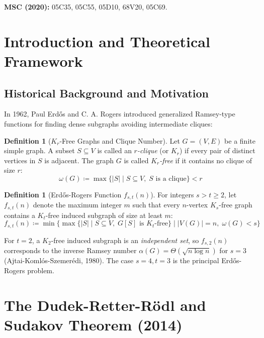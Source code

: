 \documentclass[11pt,a4paper]{article}
\theoremstyle{definition}
\newtheorem{definition}[theorem]{Definition}
\begin{document}
\noindent\textbf{MSC (2020):} 05C35, 05C55, 05D10, 68V20, 05C69.

\tableofcontents
\newpage

\section{Introduction and Theoretical Framework}

\subsection{Historical Background and Motivation}
In 1962, Paul Erd\H{o}s and C. A. Rogers \cite{erdos_rogers1962} introduced generalized Ramsey-type functions for finding dense subgraphs avoiding intermediate cliques:

\begin{definition}[$K_r$-Free Graphs and Clique Number]\label{def:clique_free}
Let $G = (V, E)$ be a finite simple graph.
A subset $S \subseteq V$ is called an \emph{$r$-clique} (or $K_r$) if every pair of distinct vertices in $S$ is adjacent.
The graph $G$ is called \emph{$K_r$-free} if it contains no clique of size $r$:
\begin{equation}\label{eq:kr_free_def}
\omega(G) \coloneqq \max \{ |S| \mid S \subseteq V, \; S \text{ is a clique} \} < r
\end{equation}
\end{definition}

\begin{definition}[Erd\H{o}s-Rogers Function $f_{s, t}(n)$]\label{def:erdos_rogers_fn}
For integers $s > t \ge 2$, let $f_{s, t}(n)$ denote the maximum integer $m$ such that every $n$-vertex $K_s$-free graph contains a $K_t$-free induced subgraph of size at least $m$:
\begin{equation}\label{eq:erdos_rogers_def}
f_{s, t}(n) \coloneqq \min \{ \max \{ |S| \mid S \subseteq V, \; G[S] \text{ is } K_t\text{-free} \} \mid |V(G)| = n, \; \omega(G) < s \}
\end{equation}
\end{definition}

For $t = 2$, a $K_2$-free induced subgraph is an \emph{independent set}, so $f_{s, 2}(n)$ corresponds to the inverse Ramsey number $\alpha(G) = \Theta(\sqrt{n \log n})$ for $s = 3$ (Ajtai-Koml\'os-Szemer\'edi, 1980).
The case $s = 4, t = 3$ is the principal Erd\H{o}s-Rogers problem.

\section{The Dudek-Retter-R\"odl and Sudakov Theorem (2014)}
\end{document}

